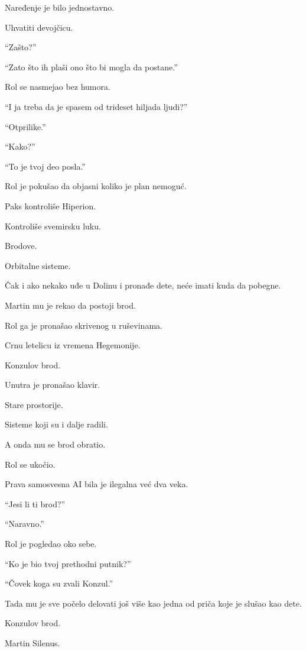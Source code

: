 Naređenje je bilo jednostavno.

Uhvatiti devojčicu.

\bigskip

``Zašto?''

``Zato što ih plaši ono što bi mogla da postane.''

Rol se nasmejao bez humora.

``I ja treba da je spasem od trideset hiljada ljudi?''

``Otprilike.''

``Kako?''

``To je tvoj deo posla.''

\bigskip

Rol je pokušao da objasni koliko je plan nemoguć.

Paks kontroliše Hiperion.

Kontroliše svemirsku luku.

Brodove.

Orbitalne sisteme.

Čak i ako nekako uđe u Dolinu i pronađe dete, neće imati kuda da pobegne.

\bigskip

Martin mu je rekao da postoji brod.

\bigskip

Rol ga je pronašao skrivenog u ruševinama.

Crnu letelicu iz vremena Hegemonije.

Konzulov brod.

\bigskip

Unutra je pronašao klavir.

Stare prostorije.

Sisteme koji su i dalje radili.

A onda mu se brod obratio.

Rol se ukočio.

Prava samosvesna AI bila je ilegalna već dva veka.

``Jesi li ti brod?''

``Naravno.''

Rol je pogledao oko sebe.

``Ko je bio tvoj prethodni putnik?''

``Čovek koga su zvali Konzul.''

\bigskip

Tada mu je sve počelo delovati još više kao jedna od priča koje je slušao kao dete.

Konzulov brod.

Martin Silenus.


